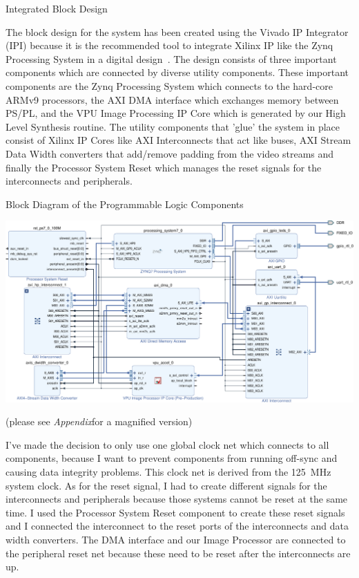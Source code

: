 \documentclass{matthijs}
\begin{document}
	\begin{hoofdstuk}{Integrated Block Design}

		The block design for the system has been created using the Vivado IP Integrator (IPI) because it is the recommended tool to integrate Xilinx IP like the Zynq Processing System in a digital design~\cite{xilinxug994}.
		The design consists of three important components which are connected by diverse utility components.
		These important components are the Zynq Processing System which connects to the hard-core ARMv9 processors, the AXI DMA interface which exchanges memory between PS/PL, and the VPU Image Processing IP Core which is generated by our High Level Synthesis routine.
		The utility components that 'glue' the system in place consist of Xilinx IP Cores like AXI Interconnects that act like buses, AXI Stream Data Width converters that add/remove padding from the video streams and finally the Processor System Reset which manages the reset signals for the interconnects and peripherals.

		\begin{figuur}{Block Diagram of the Programmable Logic Components}
			
			\centerline{\includegraphics[width=1.2\textwidth]{hw-block-diagram-v2-crop-asset.pdf}}
			
			\vspace{0.5cm}
			
			(please see \textit{Appendix}for a magnified version)

		\end{figuur}
		\vspace{-0.35ex} %

		I've made the decision to only use one global clock net which connects to all components, because I want to prevent components from running off-sync and causing data integrity problems.
		This clock net is derived from the \qty{125}{\mega\hertz} system clock.
		As for the reset signal, I had to create different signals for the interconnects and peripherals because those systems cannot be reset at the same time.
		I used the Processor System Reset component to create these reset signals and I connected the interconnect to the reset ports of the interconnects and data width converters.
		The DMA interface and our Image Processor are connected to the peripheral reset net because these need to be reset after the interconnects are up.


\end{hoofdstuk}
\end{document}
